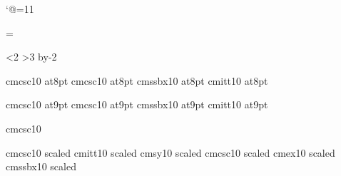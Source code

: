 

\catcode`@=11

\let\protect=\relax

%
%

%
%

\newif\iflucida
\newif\ifbasiccm
\newcount\fontscheme

\ifx\fonts\undefined\else\fontscheme=\fonts\fi

\ifnum\fontscheme<2 \lucidatrue\else\lucidafalse\fi
\ifnum\fontscheme>3 \basiccmtrue \advance\fontscheme by-2 \else\basiccmfalse\fi

%
%
%
% 


\def\fontsubst#1#2{\expandafter\def\csname subst@#1\endcsname{#2}}

\ifbasiccm
  \fontsubst{cmcsc8}{cmcsc10 at8pt}
  \fontsubst{cmcsci8}{cmcsc10 at8pt}
  \fontsubst{cmssbx8}{cmssbx10 at8pt}
  \fontsubst{cmitt8}{cmitt10 at8pt}

  \fontsubst{cmcsc9}{cmcsc10 at9pt}
  \fontsubst{cmcsci9}{cmcsc10 at9pt}
  \fontsubst{cmssbx9}{cmssbx10 at9pt}
  \fontsubst{cmitt9}{cmitt10 at9pt}

  \fontsubst{cmcsci10}{cmcsc10}

  \fontsubst{cmcsci12}{cmcsc10 scaled}
  \fontsubst{cmitt12}{cmitt10 scaled}
  \fontsubst{cmsy12}{cmsy10 scaled}
  \fontsubst{cmcsc12}{cmcsc10 scaled}
  \fontsubst{cmex12}{cmex10 scaled}
  \fontsubst{cmssbx12}{cmssbx10 scaled\magstep1}

